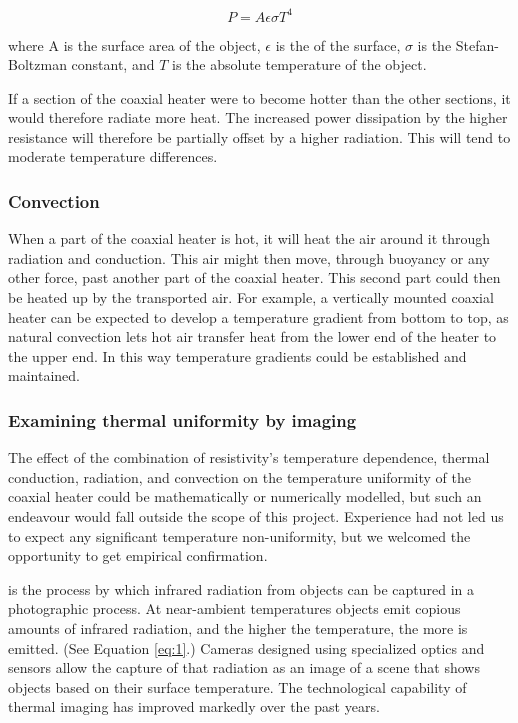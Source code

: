 \begin{equation}\label{eq:1}
	P=A \epsilon \sigma T^4
\end{equation}

where A is the surface area of the object, \(\epsilon\) is the
 of the surface, \(\sigma\) is the Stefan-Boltzman constant,
and \(T\) is the absolute temperature of the object. 

If a section of the coaxial heater were to become hotter than the other
sections, it would therefore radiate more heat. The increased power dissipation
by the higher resistance will therefore be partially offset by a higher
radiation. This will tend to moderate temperature differences.

\subsubsection{Convection}

When a part of the coaxial heater is hot, it will heat the air around it through
radiation and conduction. This air might then move, through buoyancy or any
other force, past another part of the coaxial heater. This second part could
then be heated up by the transported air. For example, a vertically mounted
coaxial heater can be expected to develop a temperature gradient from bottom to
top, as natural convection lets hot air transfer heat from the lower end of the
heater to the upper end. In this way temperature gradients could be established
and maintained.

\subsubsection{Examining thermal uniformity by imaging}

The effect of the combination of resistivity's temperature dependence, thermal
conduction, radiation, and convection on the temperature uniformity of the
coaxial heater could be mathematically or numerically modelled, but such an
endeavour would fall outside the scope of this project. Experience had not led
us to expect any significant temperature non-uniformity, but we welcomed the 
opportunity to get empirical confirmation.

 is the process by which infrared radiation from
objects can be captured in a photographic process. At near-ambient temperatures
objects emit copious amounts of infrared radiation, and the higher the
temperature, the more is emitted. (See Equation \ref{eq:1}.) Cameras designed
using specialized optics and sensors allow the capture of that radiation as an
image of a scene that shows objects based on their surface temperature. The
technological capability of thermal imaging has improved markedly over the past
years.

